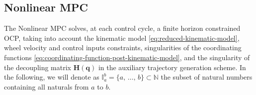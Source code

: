 
\subsection{Nonlinear MPC}
\label{sec:model-predictive-control}
The Nonlinear MPC solves, at each control cycle, a finite horizon constrained OCP, taking into account the kinematic model \eqref{eq:reduced-kinematic-model}, wheel velocity and control inputs constraints, singularities of the coordinating functions \eqref{eq:coordinating-function-post-kinematic-model}, and the singularity of the decoupling matrix $\bm{H}(\bm{q})$ in the auxiliary trajectory generation scheme.
In the following, we will denote as $\mathbb{I}_a^b=\{a,\, \dots,\, b\}\subset\mathbb{N}$ the subset of natural numbers containing all naturals from $a$ to $b$.

